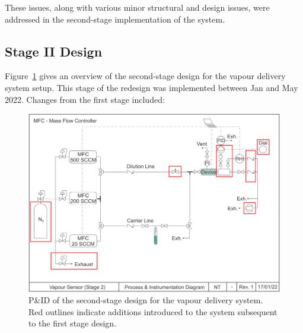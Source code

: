 \documentclass[
  a4paper,
]{scrbook}
\begin{document}
These issues, along with various minor structural and design issues,
were addressed in the second-stage implementation of the system.

\hypertarget{stage-ii-design}{%
\subsection{Stage II Design}\label{stage-ii-design}}

Figure~\ref{fig-stage-2-pid} gives an overview of the second-stage
design for the vapour delivery system setup. This stage of the redesign
was implemented between Jan and May 2022. Changes from the first stage
included:

\begin{figure}

{\centering \includegraphics[width=1\textwidth,height=\textheight]{figures/ch8/PID_V2.png}

}

\caption[P\&ID of Stage II of the vapour delivery
system.]{\label{fig-stage-2-pid}P\&ID of the second-stage design for the
vapour delivery system. Red outlines indicate additions introduced to
the system subsequent to the first stage design.}

\end{figure}
\end{document}
